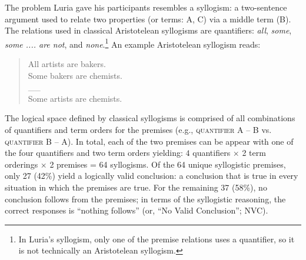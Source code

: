 \documentclass[floatsintext, doc]{apa6}
\begin{document}

The problem Luria gave his participants resembles a syllogism: a two-sentence argument used to relate two properties (or terms: A, C) via a middle term (B). 
The relations used in classical Aristotelean syllogisms are quantifiers: \emph{all}, \emph{some}, \emph{some .... are not}, and \emph{none}.\footnote{In Luria's syllogism, only one of the premise relations uses a quantifier, so it is not technically an Aristotelean syllogism.} 
An example Aristotelean syllogism reads:

\begin{quote}
All artists are bakers. \\
Some bakers are chemists. \\
\_\_ \\
Some artists are chemists.
\end{quote}

The logical space defined by classical syllogisms is comprised of all combinations of quantifiers and term orders for the premises (e.g., \textsc{quantifier} \textsc{A} -- \textsc{B} vs. \textsc{quantifier} \textsc{B} -- \textsc{A}).
In total, each of the two premises can be appear with one of the four quantifiers and two term orders yielding:  $4$ quantifiers  $\times$ 2 term orderings $\times$ 2 premises = 64 syllogisms.
Of the 64 unique syllogistic premises, only 27  (42\%) yield a logically valid conclusion: a conclusion that is true in every situation in which the premises are true.
For the remaining 37 (58\%), no conclusion follows from the premises; in terms of the syllogistic reasoning, the correct responses is ``nothing follows'' (or, ``No Valid Conclusion''; NVC). 
\end{document}
